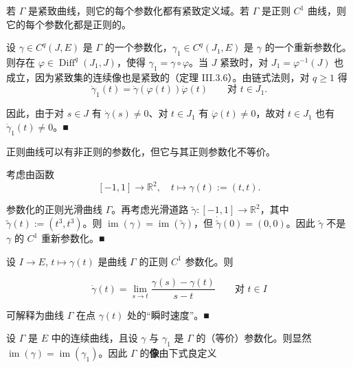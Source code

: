 \begin{remark}

\begin{items}
\item

若 $ \Gamma $ 是紧致曲线，则它的每个参数化都有紧致定义域。若 $ \Gamma $ 是正则 $ C^{1} $ 曲线，则它的每个参数化都是正则的。

\proofhead
设 $ \gamma \in C^{q}(J,E) $ 是 $ \Gamma $ 的一个参数化，$ \gamma_1 \in C^{q}(J_1,E) $ 是 $ \gamma $ 的一个重新参数化。则存在 $ \varphi \in \operatorname{Diff}^{q}(J_1,J) $，使得 $ \gamma_1 = \gamma \circ \varphi $。当 $ J $ 紧致时，对 $ J_1 = \varphi^{-1}(J) $ 也成立，因为紧致集的连续像也是紧致的（定理 III.3.6）。由链式法则，对 $ q \ge 1 $ 得
\[
\dot{\gamma}_1(t) = \dot{\gamma}(\varphi(t))\dot{\varphi}(t) \qquad \text{对 } t \in J_1 .
\]

因此，由于对 $ s \in J $ 有 $ \dot{\gamma}(s) \ne 0 $、对 $ t \in J_1 $ 有 $ \dot{\varphi}(t) \ne 0 $，故对 $ t \in J_1 $ 也有 $ \dot{\gamma}_1(t) \ne 0 $。\nobreak\hspace{0.35em}■

\item

正则曲线可以有非正则的参数化，但它与其正则参数化不等价。

\proofhead
考虑由函数
\[
[-1,1] \to \mathbb{R}^{2} , \quad t \mapsto \gamma(t) := (t,t) .
\]

参数化的正则光滑曲线 $ \Gamma $。再考虑光滑道路 $ \tilde{\gamma} : [-1,1] \to \mathbb{R}^{2} $，其中 $ \tilde{\gamma}(t) := (t^{3},t^{3}) $。则 $ \operatorname{im}(\gamma) = \operatorname{im}(\tilde{\gamma}) $，但 $ \dot{\tilde{\gamma}}(0) = (0,0) $。因此 $ \tilde{\gamma} $ 不是 $ \gamma $ 的 $ C^{1} $ 重新参数化。\nobreak\hspace{0.35em}■

\item

设 $ I \to E $, $ t \mapsto \gamma(t) $ 是曲线 $ \Gamma $ 的正则 $ C^{1} $ 参数化。则

\[
\dot{\gamma}(t) = \lim_{s \to t}\frac{\gamma(s) - \gamma(t)}{s - t} \qquad \text{对 } t \in I
\]

可解释为曲线 $ \Gamma $ 在点 $ \gamma(t) $ 处的“瞬时速度”。\nobreak\hspace{0.35em}■

\end{items}

设 $ \Gamma $ 是 $ E $ 中的连续曲线，且设 $ \gamma $ 与 $ \gamma_1 $ 是 $ \Gamma $ 的（等价）参数化。则显然 $ \operatorname{im}(\gamma) = \operatorname{im}(\gamma_1) $。因此 $ \Gamma $ 的\textbf{像}由下式良定义


\end{remark}
